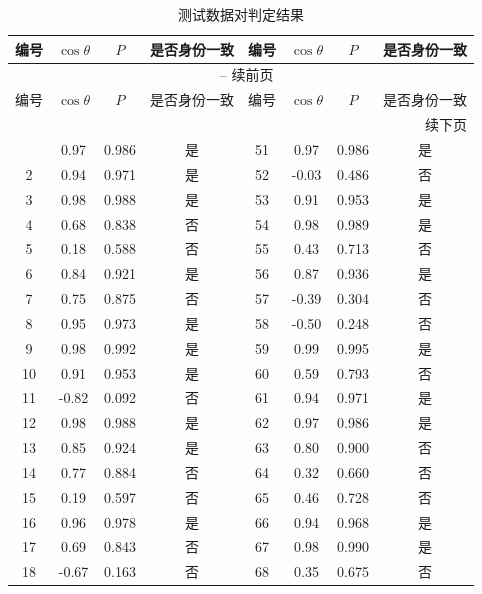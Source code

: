 \documentclass[withoutpreface]{cumcmthesis}
\begin{document}
\begin{longtable}[!htbp]{|c|c|c|c|c|c|c|c|}
    \caption{测试数据对判定结果} \label{tab:测试数据对判定结果} \\
    \hline
    编号 & $\cos \theta$ & $P$ & 是否身份一致 & 编号 & $\cos \theta$ & $P$ & 是否身份一致 \\ \hline
    \endfirsthead
    \multicolumn{8}{c}{{\tablename\ \thetable{} -- 续前页}} \\ \hline
    编号 & $\cos \theta$ & $P$ & 是否身份一致 & 编号 & $\cos \theta$ & $P$ & 是否身份一致 \\ \hline
    \endhead
    \hline
    \multicolumn{8}{r}{{续下页}} \\ \hline
    \endfoot

    \endlastfoot
        1 & 0.97 & 0.986 & 是 & 51 & 0.97 & 0.986 & 是 \\ \hline 
        2 & 0.94 & 0.971 & 是 & 52 & -0.03 & 0.486 & 否 \\ \hline
        3 & 0.98 & 0.988 & 是 & 53 & 0.91 & 0.953 & 是 \\ \hline
        4 & 0.68 & 0.838 & 否 & 54 & 0.98 & 0.989 & 是 \\ \hline
        5 & 0.18 & 0.588 & 否 & 55 & 0.43 & 0.713 & 否 \\ \hline
        6 & 0.84 & 0.921 & 是 & 56 & 0.87 & 0.936 & 是 \\ \hline
        7 & 0.75 & 0.875 & 否 & 57 & -0.39 & 0.304 & 否 \\ \hline
        8 & 0.95 & 0.973 & 是 & 58 & -0.50 & 0.248 & 否 \\ \hline
        9 & 0.98 & 0.992 & 是 & 59 & 0.99 & 0.995 & 是 \\ \hline
        10 & 0.91 & 0.953 & 是 & 60 & 0.59 & 0.793 & 否 \\ \hline
        11 & -0.82 & 0.092 & 否 & 61 & 0.94 & 0.971 & 是 \\ \hline
        12 & 0.98 & 0.988 & 是 & 62 & 0.97 & 0.986 & 是 \\ \hline
        13 & 0.85 & 0.924 & 是 & 63 & 0.80 & 0.900 & 否 \\ \hline
        14 & 0.77 & 0.884 & 否 & 64 & 0.32 & 0.660 & 否 \\ \hline
        15 & 0.19 & 0.597 & 否 & 65 & 0.46 & 0.728 & 否 \\ \hline
        16 & 0.96 & 0.978 & 是 & 66 & 0.94 & 0.968 & 是 \\ \hline
        17 & 0.69 & 0.843 & 否 & 67 & 0.98 & 0.990 & 是 \\ \hline
        18 & -0.67 & 0.163 & 否 & 68 & 0.35 & 0.675 & 否 \\ \hline

\end{longtable}
\end{document}
